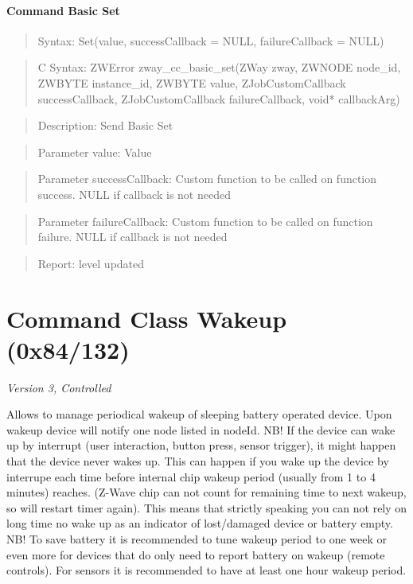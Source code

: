 \paragraph{Command Basic Set}
\begin{quote}Syntax: Set(value, successCallback = NULL, failureCallback = NULL)\end{quote}
\begin{quote}C Syntax: ZWError zway\_cc\_basic\_set(ZWay zway, ZWNODE node\_id, ZWBYTE instance\_id, ZWBYTE value, ZJobCustomCallback successCallback, ZJobCustomCallback failureCallback, void* callbackArg)\end{quote}
\begin{quote}Description: Send Basic Set\end{quote}
\begin{quote}Parameter value: Value\end{quote}
\begin{quote}Parameter successCallback: Custom function to be called on function success. NULL if callback is not needed\end{quote}
\begin{quote}Parameter failureCallback: Custom function to be called on function failure. NULL if callback is not needed\end{quote}
\begin{quote}Report: level updated\end{quote}


\section{Command Class Wakeup (0x84/132)}

\textit{Version 3, Controlled}
\newline

Allows to manage periodical wakeup of sleeping battery operated device. Upon wakeup device will notify one node listed in nodeId. NB! If the device can wake up by interrupt (user interaction, button press, sensor trigger), it might happen that the device never wakes up. This can happen if you wake up the device by interrupe each time before internal chip wakeup period (usually from 1 to 4 minutes) reaches. (Z-Wave chip can not count for remaining time to next wakeup, so will restart timer again). This means that strictly speaking you can not rely on long time no wake up as an indicator of lost/damaged device or battery empty. NB! To save battery it is recommended to tune wakeup period to one week or even more for devices that do only need to report battery on wakeup (remote controls). For sensors it is recommended to have at least one hour wakeup period.
\newline

